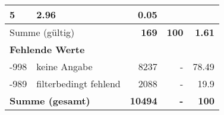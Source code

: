 \begin{longtable}{lXrrr}
       \num{5} &
       \num[round-mode=places,round-precision=2]{2,96} &
         \num[round-mode=places,round-precision=2]{0,05} \\
     \midrule
     \multicolumn{2}{l}{Summe (gültig)} &
       \textbf{\num{169}} &
     \textbf{100} &
       \textbf{\num[round-mode=places,round-precision=2]{1,61}} \\
     \multicolumn{5}{l}{\textbf{Fehlende Werte}}\\
       -998 &
       keine Angabe &
         \num{8237} &
        - &
         \num[round-mode=places,round-precision=2]{78,49} \\
       -989 &
       filterbedingt fehlend &
         \num{2088} &
        - &
         \num[round-mode=places,round-precision=2]{19,9} \\
     \midrule
     \multicolumn{2}{l}{\textbf{Summe (gesamt)}} &
          \textbf{\num{10494}} &
        \textbf{-} &
        \textbf{100} \\
     \bottomrule
     \end{longtable}
     
